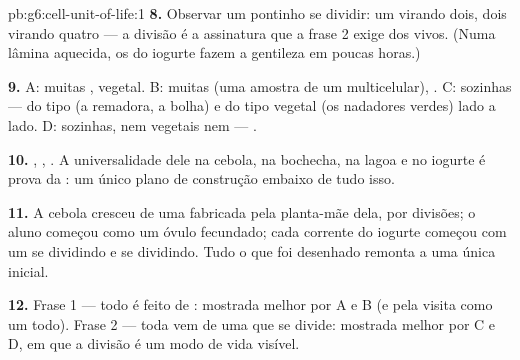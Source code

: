 \begin{solution}{pb:g6:cell-unit-of-life:1}
\textbf{8.} Observar um pontinho se dividir: um virando dois, dois
virando quatro --- a divisão é a assinatura que a frase 2 exige dos
vivos. (Numa lâmina aquecida, os  do iogurte fazem a gentileza
em poucas horas.)

\textbf{9.} A: muitas , vegetal. B: muitas  (uma amostra
de um  multicelular), . C:  sozinhas --- do tipo
 (a remadora, a bolha) e do tipo vegetal (os nadadores verdes)
lado a lado. D:  sozinhas, nem vegetais nem  ---
.

\textbf{10.} , , . A universalidade dele na
cebola, na bochecha, na lagoa e no iogurte é prova da :
um único plano de construção embaixo de tudo isso.

\textbf{11.} A cebola cresceu de uma  fabricada pela planta-mãe
dela, por divisões; o aluno começou como um óvulo fecundado; cada
corrente do iogurte começou com um  se dividindo e se
dividindo. Tudo o que foi desenhado remonta a uma única 
inicial.

\textbf{12.} Frase 1 --- todo  é feito de : mostrada
melhor por A e B (e pela visita como um todo). Frase 2 --- toda 
vem de uma  que se divide: mostrada melhor por C e D, em que a
divisão é um modo de vida visível.
\end{solution}
